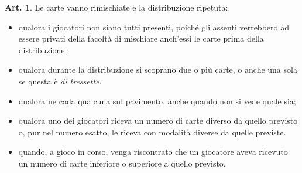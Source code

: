 \documentclass[italian,a4paper]{book}
\theoremstyle{definition}
\newtheorem{art}{Art.}
\newenvironment{packeditem}{
\begin{itemize}
  \setlength{\itemsep}{1pt}
  \setlength{\parskip}{0pt}
  \setlength{\parsep}{0pt}
}{\end{itemize}}
\begin{document}
\begin{art}
    Le carte vanno rimischiate e la distribuzione ripetuta:
    \begin{packeditem}
\item    qualora i giocatori non siano tutti presenti, poiché gli assenti verrebbero ad essere privati della facoltà di mischiare anch'essi le carte prima della distribuzione;
\item    qualora durante la distribuzione si scoprano due o più carte, o anche una sola se questa è \emph{di tressette}.
\item    qualora ne cada qualcuna sul pavimento, anche quando non si vede quale sia;
\item    qualora uno dei giocatori riceva un numero di carte diverso da quello previsto o, pur nel numero esatto, le riceva con modalità diverse da quelle previste.
\item      quando, a gioco in corso, venga riscontrato che un giocatore aveva ricevuto un numero di carte inferiore o superiore a quello previsto.
    \end{packeditem}
\end{art}
\end{document}
